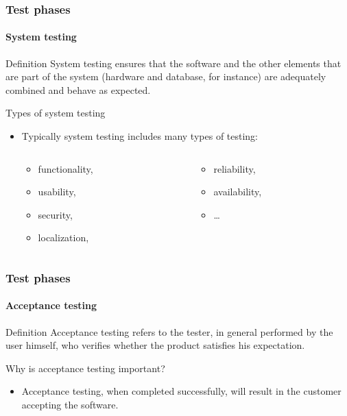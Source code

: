 \begin{frame}
\label{concept:system-testing}
\frametitle{Test phases}
\framesubtitle{System testing}

\begin{block:concept}{Definition}
System testing ensures that the software and the other elements that
are part of the system (hardware and database, for instance) are adequately
combined and behave as expected.
\end{block:concept}

\begin{block:fact}{Types of system testing}
\begin{itemize}
	\item Typically system testing includes many types of testing:
	\begin{columns}[t, totalwidth=6.5cm]
		\begin{column}[t]{3cm}
			\begin{itemize}
				\item functionality,
				\item usability,
				\item security,
				\item localization,
			\end{itemize}
		\end{column}

		\begin{column}[t]{3cm}
			\begin{itemize}
				\item reliability,
				\item availability,
				\item \ldots
			\end{itemize}
		\end{column}
	\end{columns}
\end{itemize}
\end{block:fact}

\hfill
{}
\end{frame}



\begin{frame}
\label{concept:acceptance-testing}
\frametitle{Test phases}
\framesubtitle{Acceptance testing}

\begin{block:concept}{Definition}
Acceptance testing refers to the tester, in general performed by the
user himself, who verifies whether the product satisfies his expectation.
\end{block:concept}


\begin{block:fact}{Why is acceptance testing important?}
\begin{itemize}
    \item Acceptance testing, when completed successfully, will result in the
    customer accepting the software.
\end{itemize}
\end{block:fact}
\end{frame}